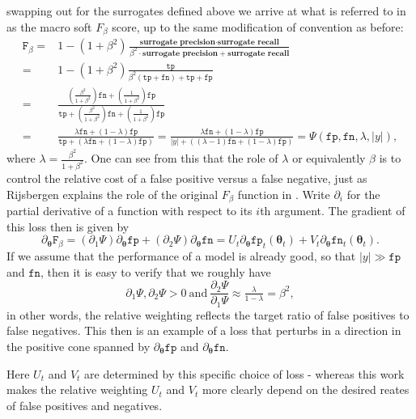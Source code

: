\documentclass[10pt,a4paper]{article}
\begin{document}
swapping out for the surrogates defined above we arrive at what is referred to in \cite{lee2021surrogate} as the macro soft $F_\beta$ score, up to the same modification of convention as before:
\begin{align*}
\texttt F_\beta=&1-(1+\beta^2)\frac{\textbf{surrogate precision}\cdot\textbf{surrogate recall}}{\beta^2\cdot\textbf{surrogate precision}+\textbf{surrogate recall}}\\
=&1-(1+\beta^2)\frac{\texttt{tp}}{\beta^2(\texttt{tp}+\texttt{fn})+\texttt{tp}+\texttt{fp}}\\
  =&\frac{\left(\tfrac{\beta^2}{1+\beta^2}\right)\texttt{fn}+\left(\tfrac1{1+\beta^2}\right)\texttt{fp}}{\texttt{tp}+\left(\tfrac{\beta^2}{1+\beta^2}\right)\texttt{fn}+\left(\tfrac1{1+\beta^2}\right)\texttt{fp}}\\
  =&\frac{\lambda\texttt{fn}+(1-\lambda)\texttt{fp}}{\texttt{tp}+\left(\lambda\texttt{fn}+(1-\lambda)\texttt{fp}\right)}=\frac{\lambda\texttt{fn}+(1-\lambda)\texttt{fp}}{|y|+\left((\lambda-1)\texttt{fn}+(1-\lambda)\texttt{fp}\right)}=\Psi(\texttt{fp},\texttt{fn},\lambda,|y|),
\end{align*}
where $\lambda=\tfrac{\beta^2}{1+\beta^2}$.
One can see from this that the role of $\lambda$ or equivalently $\beta$ is to control the relative cost of a false positive versus a false negative, just as Rijsbergen explains the role of the original $F_\beta$ function in \cite{van1979information}.
Write $\partial_i$ for the partial derivative of a function with respect to its $i$th argument.
The gradient of this loss then is given by
$$
\partial_{\boldsymbol\theta}\texttt{F}_\beta=(\partial_1\Psi)\partial_{\boldsymbol\theta}\texttt{fp}+(\partial_2\Psi)\partial_{\boldsymbol\theta}\texttt{fn}=U_t\partial_{\boldsymbol\theta}\texttt{fp}_t(\boldsymbol\theta_t)+V_t\partial_{\boldsymbol\theta}\texttt{fn}_t(\boldsymbol\theta_t).
$$
If we assume that the performance of a model is already good, so that $|y|\gg\texttt{fp}$ and $\texttt{fn}$, then it is easy to verify that we roughly have
$$
\partial_1\Psi,\partial_2\Psi>0~\text{and}~\frac{\partial_2\Psi}{\partial_1\Psi}\approx\tfrac\lambda{1-\lambda}=\beta^2,
$$
in other words, the relative weighting reflects the target ratio of false positives to false negatives.
This then is an example of a loss that perturbs in a direction in the positive cone spanned by $\partial_{\boldsymbol\theta}\texttt{fp}$ and $\partial_{\boldsymbol\theta}\texttt{fn}$.

Here $U_t$ and $V_t$ are determined by this specific choice of loss - whereas this work makes the relative weighting $U_t$ and $V_t$ more clearly depend on the desired reates of false positives and negatives.
\end{document}

